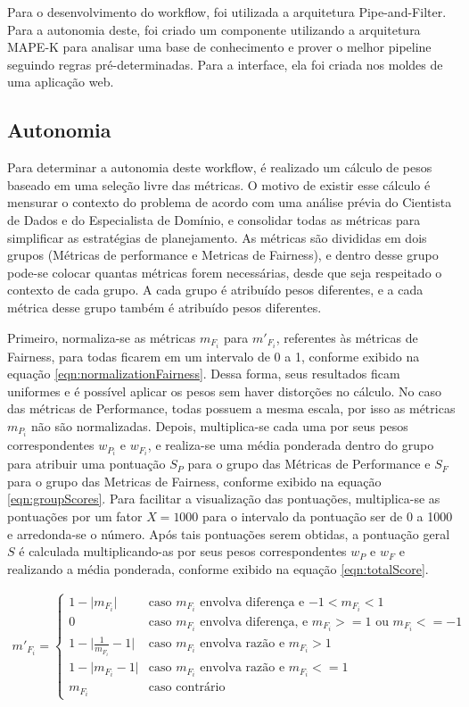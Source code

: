 \documentclass[twocolumn]{article}
\begin{document}
Para o desenvolvimento do workflow, foi utilizada a arquitetura Pipe-and-Filter. Para a autonomia deste, foi criado um componente utilizando a arquitetura MAPE-K para analisar uma base de conhecimento e prover o melhor pipeline seguindo regras pré-determinadas. Para a interface, ela foi criada nos moldes de uma aplicação web. 

\subsection{Autonomia}

Para determinar a autonomia deste workflow, é realizado um cálculo de pesos baseado em uma seleção livre das métricas. O motivo de existir esse cálculo é mensurar o contexto do problema de acordo com uma análise prévia do Cientista de Dados e do Especialista de Domínio, e consolidar todas as métricas para simplificar as estratégias de planejamento. As métricas são divididas em dois grupos (Métricas de performance e Metricas de Fairness), e dentro desse grupo pode-se colocar quantas métricas forem necessárias, desde que seja respeitado o contexto de cada grupo. A cada grupo é atribuído pesos diferentes, e a cada métrica desse grupo também é atribuído pesos diferentes.

Primeiro, normaliza-se as métricas $m_{F_i}$ para $m'_{F_i}$, referentes às métricas de Fairness, para todas ficarem em um intervalo de 0 a 1, conforme exibido na equação \ref{eqn:normalizationFairness}. Dessa forma, seus resultados ficam uniformes e é possível aplicar os pesos sem haver distorções no cálculo. No caso das métricas de Performance, todas possuem a mesma escala, por isso as métricas $m_{P_i}$ não são normalizadas. Depois, multiplica-se cada uma por seus pesos correspondentes $w_{P_i}$ e $w_{F_i}$, e realiza-se uma média ponderada dentro do grupo para atribuir uma pontuação $S_P$ para o grupo das Métricas de Performance e $S_F$ para o grupo das Metricas de Fairness, conforme exibido na equação \ref{eqn:groupScores}. Para facilitar a visualização das pontuações, multiplica-se as pontuações por um fator $X = 1000$ para o intervalo da pontuação ser de 0 a 1000 e arredonda-se o número. Após tais pontuações serem obtidas, a pontuação geral $S$ é calculada multiplicando-as por seus pesos correspondentes $w_P$ e $w_F$ e realizando a média ponderada, conforme exibido na equação \ref{eqn:totalScore}.

\begin{gather}
\label{eqn:normalizationFairness}
	m'_{F_i} = 
	\begin{cases}
	1-\lvert m_{F_i} \rvert & \text{caso $m_{F_i}$ envolva diferen\c{c}a e $-1 < m_{F_i} < 1$}\\
	0 & \text{caso $m_{F_i}$ envolva diferen\c{c}a, e $m_{F_i} >= 1$ ou $m_{F_i} <= -1$}\\
	1-\lvert \frac{1}{m_{F_i}}-1 \lvert & \text{caso $m_{F_i}$ envolva razão e $m_{F_i} > 1$}\\
	1-\lvert m_{F_i}-1 \lvert & \text{caso $m_{F_i}$ envolva razão e $m_{F_i} <= 1$}\\
	m_{F_i} & \text{caso contrário}
	\end{cases}
\end{gather}
\end{document}
